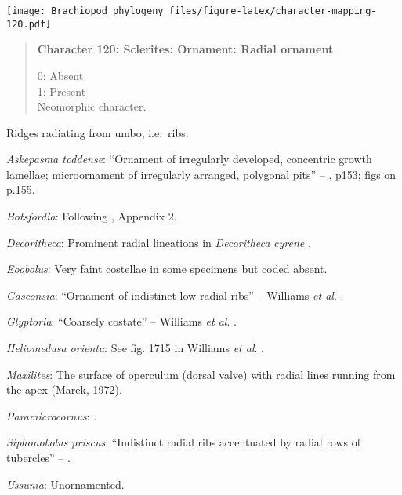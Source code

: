 \documentclass[openany]{book}
\theoremstyle{definition}
\theoremstyle{definition}
\theoremstyle{definition}
\theoremstyle{remark}
\begin{document}
\texttt{[image: Brachiopod\_phylogeny\_files/figure-latex/character-mapping-120.pdf]}

\begin{quote}
\textbf{Character 120: Sclerites: Ornament: Radial ornament}

0: Absent\\
1: Present\\
Neomorphic character.
\end{quote}

Ridges radiating from umbo, i.e.~ribs.

\hypertarget{Askepasma_toddense-coding-120}{}
\emph{Askepasma toddense}: ``Ornament of irregularly developed,
concentric growth lamellae; microornament of irregularly arranged,
polygonal pits'' -- \citet{Williams2000LinguliformeaCraniiformea}, p153;
figs on p.155.

\hypertarget{Botsfordia-coding-120}{}
\emph{Botsfordia}: Following \citet{Williams1998Thediversity}, Appendix
2.

\hypertarget{Decoritheca-coding-120}{}
\emph{Decoritheca}: Prominent radial lineations in \emph{Decoritheca}
\emph{cyrene} \citep{Malinky1987}.

\hypertarget{Eoobolus-coding-120}{}
\emph{Eoobolus}: Very faint costellae in some specimens but coded
absent.

\hypertarget{Gasconsia-coding-120}{}
\emph{Gasconsia}: ``Ornament of indistinct low radial ribs'' -- Williams
\emph{et al}. \citeyearpar[p167]{Williams2000LinguliformeaCraniiformea}.

\hypertarget{Glyptoria-coding-120}{}
\emph{Glyptoria}: ``Coarsely costate'' -- Williams \emph{et al}.
\citeyearpar[p710]{Williams2000LinguliformeaCraniiformea}.

\hypertarget{Heliomedusa_orienta-coding-120}{}
\emph{Heliomedusa orienta}: See fig. 1715 in Williams \emph{et al}.
\citeyearpar{Williams2007Supplement}.

\hypertarget{Maxilites-coding-120}{}
\emph{Maxilites}: The surface of operculum (dorsal valve) with radial
lines running from the apex (Marek, 1972).

\hypertarget{Paramicrocornus-coding-120}{}
\emph{Paramicrocornus}: \citet{Zhang2018Ahyolithid}.

\hypertarget{Siphonobolus_priscus-coding-120}{}
\emph{Siphonobolus priscus}: ``Indistinct radial ribs accentuated by
radial rows of tubercles'' -- \citet{Popov2009Earlyontogeny}.

\hypertarget{Ussunia-coding-120}{}
\emph{Ussunia}: Unornamented.
\end{document}
